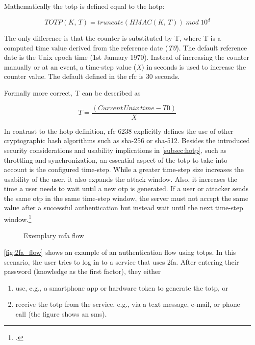 Mathematically the \gls{totp} is defined equal to the \gls{hotp}:

\begin{equation*}
	TOTP(K,\, T) = truncate(HMAC(K,\, T))\; mod \; 10^d
\end{equation*}

The only difference is that the counter is substituted by T, where T is a computed time value derived from the reference date (\textit{T0}). The default reference date is the Unix epoch time (1st January 1970). Instead of increasing the counter manually or at an event, a time-step value (\textit{X}) in seconds is used to increase the counter value. The default defined in the \gls{rfc} is 30 seconds.

Formally more correct, T can be described as

\begin{equation*}
	T = \frac{(Current\, Unix\, time - T0)}{X}
\end{equation*}

In contrast to the \gls{hotp} definition, \gls{rfc} 6238 explicitly defines the use of other cryptographic hash algorithms such as \gls{sha}-256 or \gls{sha}-512. Besides the introduced security considerations and usability implications in \autoref{subsec:hotp}, such as throttling and synchronization, an essential aspect of the \gls{totp} to take into account is the configured time-step. While a greater time-step size increases the usability of the user, it also expands the attack window. Also, it increases the time a user needs to wait until a new \gls{otp} is generated. If a user or attacker sends the same \gls{otp} in the same time-step window, the server must not accept the same value after a successful authentication but instead wait until the next time-step window.\footcite[See][6]{m2011rfc}

\begin{figure}[hbt]
	\centering
	
	\caption[Exemplary \gls{mfa} flow]{Exemplary \gls{mfa} flow\footnotemark}
	\label{fig:2fa_flow}
\end{figure}

\autoref{fig:2fa_flow} shows an example of an authentication flow using \glspl{totp}. In this scenario, the user tries to log in to a service that uses \gls{2fa}. After entering their password (knowledge as the first factor), they either

\begin{enumerate}[label=(\alph*)]
	\item use, e.g., a smartphone app or hardware token to generate the \gls{totp}, or
	\item receive the \gls{totp} from the service, e.g., via a text message, e-mail, or phone call (the figure shows an \gls{sms}).
\end{enumerate}


